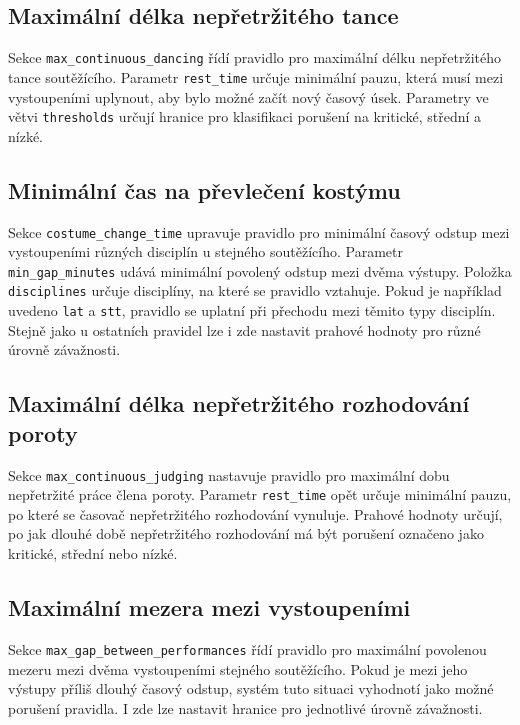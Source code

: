 \documentclass[czech, kiv, ba, he, iso690alph, pdf]{fasthesis}
\begin{document}
			\subsection{Maximální délka nepřetržitého tance}
	
				Sekce \texttt{max\_continuous\_dancing} řídí pravidlo pro maximální délku nepřetržitého tance soutěžícího. Parametr \texttt{rest\_time} určuje minimální pauzu, která musí mezi vystoupeními uplynout, aby bylo možné začít nový časový úsek. Parametry ve větvi \texttt{thresholds} určují hranice pro klasifikaci porušení na kritické, střední a nízké.
	
			\subsection{Minimální čas na převlečení kostýmu}
	
				Sekce \texttt{costume\_change\_time} upravuje pravidlo pro minimální časový odstup mezi vystoupeními různých disciplín u stejného soutěžícího. Parametr \texttt{min\_gap\_minutes} udává minimální povolený odstup mezi dvěma výstupy. Položka \texttt{disciplines} určuje disciplíny, na které se pravidlo vztahuje. Pokud je například uvedeno \texttt{lat} a \texttt{stt}, pravidlo se uplatní při přechodu mezi těmito typy disciplín. Stejně jako u ostatních pravidel lze i zde nastavit prahové hodnoty pro různé úrovně závažnosti.
	
			\subsection{Maximální délka nepřetržitého rozhodování poroty}
	
				Sekce \texttt{max\_continuous\_judging} nastavuje pravidlo pro maximální dobu nepřetržité práce člena poroty. Parametr \texttt{rest\_time} opět určuje minimální pauzu, po které se časovač nepřetržitého rozhodování vynuluje. Prahové hodnoty určují, po jak dlouhé době nepřetržitého rozhodování má být porušení označeno jako kritické, střední nebo nízké.
	
			\subsection{Maximální mezera mezi vystoupeními}
	
				Sekce \texttt{max\_gap\_between\_performances} řídí pravidlo pro maximální povolenou mezeru mezi dvěma vystoupeními stejného soutěžícího. Pokud je mezi jeho výstupy příliš dlouhý časový odstup, systém tuto situaci vyhodnotí jako možné porušení pravidla. I zde lze nastavit hranice pro jednotlivé úrovně závažnosti.
	
\end{document}
